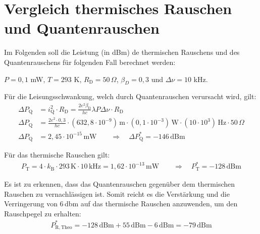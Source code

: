 
\section{Vergleich thermisches Rauschen und Quantenrauschen}
\label{sec:rauschen}

Im Folgenden soll die Leistung (in dBm) de thermischen Rauschens und des Quantenrauschens für folgenden Fall berechnet werden:

$P = 0,1$ mW, $T = 293$ K, $R_\mathrm{D} = 50\, \Omega$, $\beta_D = 0,3$ und $\Delta \nu = 10$ kHz.

Für die Leisungsschwankung, welch durch Quantenrauschen verursacht wird, gilt:
\begin{align}
    \Delta P_\mathrm{Q} &= i^2_\mathrm{Q} \cdot R_\mathrm{D} = \frac{2e^2\beta_\mathrm{D}}{hc}\lambda P \Delta \nu \cdot R_\mathrm{D}\\
    \Delta P_\mathrm{Q} &= \frac{2e^2 \cdot 0,3}{hc} \cdot (632,8 \cdot 10^{-9}) \, \mathrm{m} \cdot (0,1 \cdot 10^{-3})\, \mathrm{W} \cdot (10 \cdot 10^3) \, \mathrm{Hz} \cdot 50 \, \Omega \\
    \Delta P_\mathrm{Q} &= 2,45 \cdot 10^{-15}\,\mathrm{mW} \qquad \Rightarrow \quad \Delta P_\mathrm{Q}^* = -146 \, \mathrm{dBm}
\end{align}

Für das thermische Rauschen gilt:
\begin{gather}
    P_\mathrm{T} = 4 \cdot k_\mathrm{B} \cdot 293\,\text{K} \cdot 10\,\text{kHz} = 1,62 \cdot 10^{-13}\, \text{mW} \qquad \Rightarrow \quad P_\mathrm{T}^* = -128 \, \text{dBm}
\end{gather}

Es ist zu erkennen, dass das Quantenrauschen gegenüber dem thermischen Rauschen zu vernachlässigen ist.
Somit reicht es die Verstärkung und die Verringerung von 6\,dbm \cite{anleitung} auf das thermische Rauschen anzuwenden, um den Rauschpegel zu erhalten:
\begin{gather}
    P_\mathrm{R,Theo}^* = -128 \, \text{dBm} + 55\, \text{dBm} - 6 \, \text{dBm}= -79 \, \text{dBm}
\end{gather}